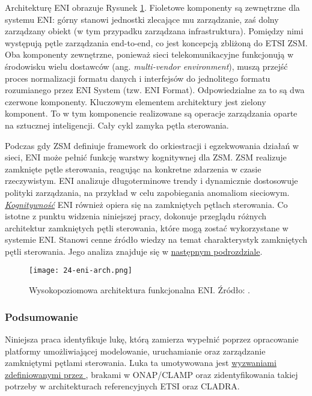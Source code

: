 Architekturę \cite{etsieni2023} ENI obrazuje Rysunek \ref{fig:24-eni-arch}. Fioletowe komponenty są zewnętrzne dla systemu ENI: górny stanowi jednostki zlecające mu zarządzanie, zaś dolny zarządzany obiekt (w tym przypadku zarządzana infrastruktura). Pomiędzy nimi występują pętle zarządzania end-to-end, co jest koncepcją zbliżoną do ETSI ZSM. Oba komponenty zewnętrzne, ponieważ sieci telekomunikacyjne funkcjonują w środowisku wielu dostawców (ang. \textit{multi-vendor environment}), muszą przejść proces normalizacji formatu danych i interfejsów do jednolitego formatu rozumianego przez ENI System (tzw. ENI Format). Odpowiedzialne za to są dwa czerwone komponenty. Kluczowym elementem architektury jest zielony komponent. To w tym komponencie realizowane są operacje zarządzania oparte na sztucznej inteligencji. Cały cykl zamyka pętla sterowania. 

Podczas gdy ZSM definiuje framework do orkiestracji i egzekwowania działań w sieci, ENI może pełnić funkcję warstwy kognitywnej dla ZSM. ZSM realizuje zamknięte pętle sterowania, reagując na konkretne zdarzenia w czasie rzeczywistym. ENI analizuje długoterminowe trendy i dynamicznie dostosowuje polityki zarządzania, na przykład w celu zapobiegania anomaliom sieciowym. \hyperlink{def:kognitywnosc}{\textit{Kognitywność}} ENI również opiera się na zamkniętych pętlach sterowania. Co istotne z punktu widzenia niniejszej pracy, \cite{etsieni2024} dokonuje przeglądu różnych architektur zamkniętych pętli sterowania, które mogą zostać wykorzystane w systemie ENI. Stanowi cenne źródło wiedzy na temat charakterystyk zamkniętych pętli sterowania. Jego analiza znajduje się w \hyperlink{sec:25}{następnym podrozdziale}.



\begin{figure}[!h]
    \centering \texttt{[image: 24-eni-arch.png]}
    \caption{Wysokopoziomowa architektura funkcjonalna ENI. Źródło: \cite{etsieni2023}.}\label{fig:24-eni-arch}
\end{figure}


\subsubsection{Podsumowanie}

Niniejsza praca identyfikuje lukę, którą zamierza wypełnić poprzez opracowanie platformy umożliwiającej modelowanie, uruchamianie oraz zarządzanie zamkniętymi pętlami sterowania. Luka ta umotywowana jest \hyperlink{list:1}{wyzwaniami zdefiniowanymi przez \cite{fallon2019}}, brakami w ONAP/CLAMP oraz zidentyfikowania takiej potrzeby w architekturach referencyjnych ETSI oraz CLADRA.
